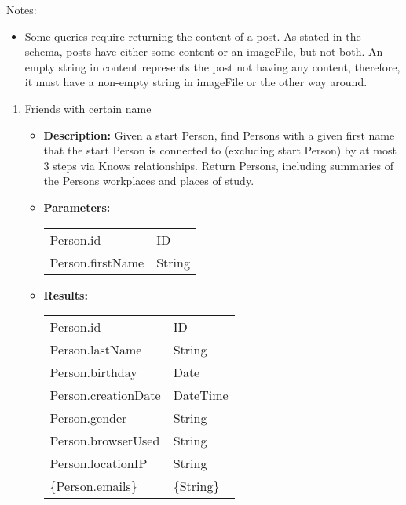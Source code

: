 Notes:
\begin{itemize}
    \item Some queries require returning the content of a post. As stated in the
        schema, posts have either some content or an imageFile, but not both. An empty string in
        content represents the post not having any content, therefore, it must have a
        non-empty string in imageFile or the other way around.
\end{itemize}

{\small
    \begin{enumerate}
        \item Friends with certain name
            \begin{itemize}
                \item \textbf{Description:}
                    Given a start Person, find Persons with a given first name
                    that the start Person is connected to (excluding start Person) by
                    at most 3 steps via Knows relationships. Return Persons, including
                    summaries of the Persons workplaces and places of study.
                \item \textbf{Parameters:} \\
                    \begin{tabular}{ll}
                        Person.id 										& ID \\
                        Person.firstName								& String \\
                    \end{tabular}
                \item \textbf{Results:} \\
                    \begin{tabular}{ll}
                        Person.id 										& ID \\
                        Person.lastName									& String \\
                        Person.birthday 								& Date \\
                        Person.creationDate 							& DateTime  \\
                        Person.gender 									& String \\
                        Person.browserUsed 								& String \\
                        Person.locationIP 								& String \\
                        \{Person.emails\} 								& \{String\} \\

\end{tabular}
\end{itemize}
\end{enumerate}}
